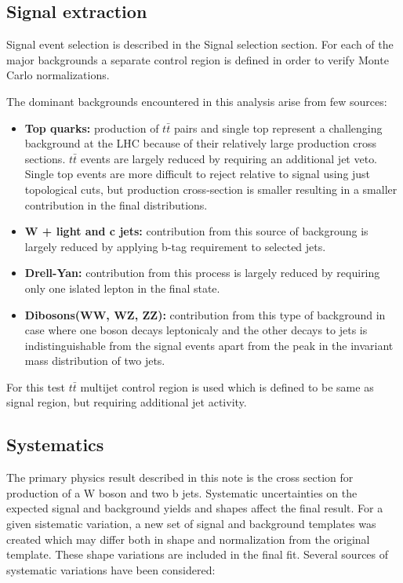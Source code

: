 \subsection{Signal extraction}
Signal event selection is described in the Signal selection section.
For each of the major backgrounds a separate control region is defined in order to verify Monte Carlo normalizations.

The dominant backgrounds encountered in this analysis arise from few sources:
\begin{itemize}
        \item {\textbf{Top quarks:}} production of $t\bar{t}$ pairs and single top represent a challenging background at the LHC because of their relatively large production cross sections.
$t\bar{t}$ events are largely reduced by requiring an additional jet veto. Single top events are more difficult to reject relative to signal using just topological cuts,
but production cross-section is smaller resulting in a smaller contribution in the final distributions.
        \item {\textbf{W + light and c jets:}} contribution from this source of backgroung is largely reduced by applying b-tag requirement to selected jets.
        \item {\textbf{Drell-Yan:}} contribution from this process is largely reduced by requiring only one islated lepton in the final state.
        \item {\textbf{Dibosons(WW, WZ, ZZ):}} contribution from this type of background in case where one boson decays leptonicaly
and the other decays to jets  is indistinguishable from the signal events apart from the peak in the invariant mass distribution of two jets.
\end{itemize}

For this test $t\bar{t}$ multijet control region is used which is defined to be same as signal region, but requiring additional jet activity.



\subsection{Systematics}

The primary physics result described in this note is the cross section for production of a W boson and two b
jets. Systematic uncertainties on the expected signal and background yields and shapes affect
the final result. For a given sistematic variation, a new set of signal and background templates was created which may differ both in shape and normalization from the original template.  These shape variations are included in the final fit. Several sources of systematic variations have been considered:

